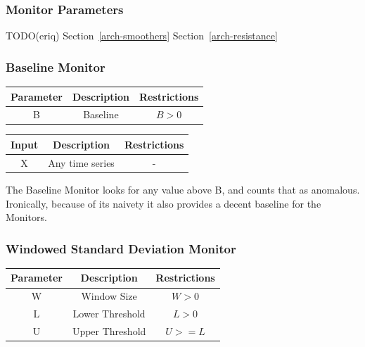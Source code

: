 \documentclass[12pt]{ucthesis}
\begin{document}
\subsubsection{Monitor Parameters}
\label{outage-detection-monitors-params}
TODO(eriq)
Section~\ref{arch-smoothers}
Section~\ref{arch-resistance}

\subsubsection{Baseline Monitor}
\label{outage-detection-monitors-Baseline}
\begin{table}[H]
   \begin{center}
      \begin{tabular}{|c|c|c|}
         \hline
            Parameter & Description & Restrictions \\
         \hline
            B & Baseline & $ B > 0 $\\
         \hline
      \end{tabular}
   \end{center}
\end{table}

\begin{table}[H]
   \begin{center}
      \begin{tabular}{|c|c|c|}
         \hline
            Input & Description & Restrictions \\
         \hline
            X & Any time series & - \\
         \hline
      \end{tabular}
   \end{center}
\end{table}

The Baseline Monitor looks for any value above B, and counts that as anomalous.
Ironically, because of its naivety it also provides a decent baseline for the Monitors.

\subsubsection{Windowed Standard Deviation Monitor}
\label{outage-detection-monitors-WindowStdDev}
\begin{table}[H]
   \begin{center}
      \begin{tabular}{|c|c|c|}
         \hline
            Parameter & Description & Restrictions \\
         \hline
            W & Window Size & $ W > 0 $\\
         \hline
            L & Lower Threshold & $L > 0 $\\
         \hline
            U & Upper Threshold & $U >= L $\\
         \hline
      \end{tabular}
   \end{center}
\end{table}
\end{document}

